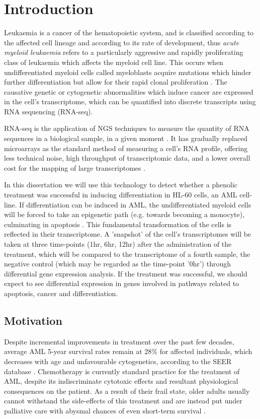 \chapter{Introduction}
\label{intro}
Leukaemia is a cancer of the hematopoietic system, and is classified according to the affected cell lineage and according to its rate of development, thus \textit{acute myeloid leukaemia} refers to a particularly aggressive and rapidly proliferating class of leukaemia which affects the myeloid cell line. This occurs when undifferentiated myeloid cells called myeloblasts acquire mutations which hinder further differentiation but allow for their rapid clonal proliferation \citep{Khwaja2016}. The causative genetic or cytogenetic abnormalities which induce cancer are expressed in the cell's transcriptome, which can be quantified into discrete transcripts using RNA sequencing (RNA-seq). 

RNA-seq is the application of \ac{NGS} techniques to measure the quantity of RNA sequences in a biological sample, in a given moment \citep{zhong2009}. It has gradually replaced microarrays as the standard method of measuring a cell's RNA profile, offering less technical noise, high throughput of transcriptomic data, and a lower overall cost for the mapping of large transcriptomes \citep{zhao2014comparison, rao2019comparison}. 

In this dissertation we will use this technology to detect whether a phenolic treatment was successful in inducing differentiation in HL-60 cells, an \ac{AML} cell-line. If differentiation can be induced in \ac{AML}, the undifferentiated myeloid cells will be forced to take an epigenetic path (e.g. towards becoming a monocyte), culminating in apoptosis \citep{santos2000expression, mark2017transcriptomes}. This fundamental transformation of the cells is reflected in their transcriptome. A 'snapshot' of the cell's transcriptomes will be taken at three time-points (1hr, 6hr, 12hr) after the administration of the treatment, which will be compared to the transcriptome of a fourth sample, the negative control (which may be regarded as the time-point '0hr') through differential gene expression analysis. If the treatment was successful, we should expect to see differential expression in genes involved in pathways related to apoptosis, cancer and differentiation.



\section{Motivation} 
Despite incremental improvements in treatment over the past few decades, average \ac{AML} 5-year survival rates remain at 28\% for affected individuals, which decreases with age and unfavourable cytogenetics, according to the SEER database \citep{sasaki2021novo}. Chemotherapy is currently standard practice for the treatment of \ac{AML}, despite its indiscriminate cytotoxic effects and resultant physiological consequences on the patient. As a result of their frail state, older adults usually cannot withstand the side-effects of this treatment and are instead put under palliative care with abysmal chances of even short-term survival \citep{lancet2018overall}. 

